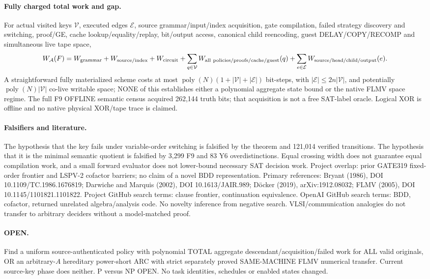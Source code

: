 \documentclass[11pt]{article}
\begin{document}
\paragraph{Fully charged total work and gap.}
For actual visited keys $\mathcal V$, executed edges $\mathcal E$, source grammar/input/index acquisition, gate compilation, failed strategy discovery and switching, proof/GE, cache lookup/equality/replay, bit/output access, canonical child reencoding, guest DELAY/COPY/RECOMP and simultaneous live tape space,
\[
W_{\mathcal A}(F)=W_{\rm grammar}+W_{\rm source/index}+W_{\rm circuit}
+\sum_{q\in\mathcal V}W_{\rm all\ policies/proofs/cache/guest}(q)
+\sum_{e\in\mathcal E}W_{\rm source/head/child/output}(e).
\]
A straightforward fully materialized scheme costs at most $\operatorname{poly}(N)(1+|\mathcal V|+|\mathcal E|)$ bit-steps, with $|\mathcal E|\le 2n|\mathcal V|$, and potentially $\operatorname{poly}(N)|\mathcal V|$ co-live writable space; NONE of this establishes either a polynomial aggregate state bound or the native FLMV space regime. The full F9 OFFLINE semantic census acquired 262,144 truth bits; that acquisition is not a free SAT-label oracle. Logical XOR is offline and no native physical XOR/tape trace is claimed.
\paragraph{Falsifiers and literature.}
The hypothesis that the key fails under variable-order switching is falsified by the theorem and 121,014 verified transitions. The hypothesis that it is the minimal semantic quotient is falsified by 3,299 F9 and 83 Y6 overdistinctions. Equal crossing width does not guarantee equal compilation work, and a small forward evaluator does not lower-bound necessary SAT decision work. Project overlap: prior GATE319 fixed-order frontier and LSPV-2 cofactor barriers; no claim of a novel BDD representation. Primary references: Bryant (1986), DOI 10.1109/TC.1986.1676819; Darwiche and Marquis (2002), DOI 10.1613/JAIR.989; D\"ocker (2019), arXiv:1912.08032; FLMV (2005), DOI 10.1145/1101821.1101822. Project GitHub search terms: clause frontier, continuation equivalence. OpenAI GitHub search terms: BDD, cofactor, returned unrelated algebra/analysis code. No novelty inference from negative search. VLSI/communication analogies do not transfer to arbitrary deciders without a model-matched proof.
\paragraph{OPEN.}
Find a uniform source-authenticated policy with polynomial TOTAL aggregate descendant/acquisition/failed work for ALL valid originals, OR an arbitrary-$A$ hereditary power-short ARC with strict separately proved SAME-MACHINE FLMV numerical transfer. Current source-key phase does neither. P versus NP OPEN. No task identities, schedules or enabled states changed.
\end{document}
